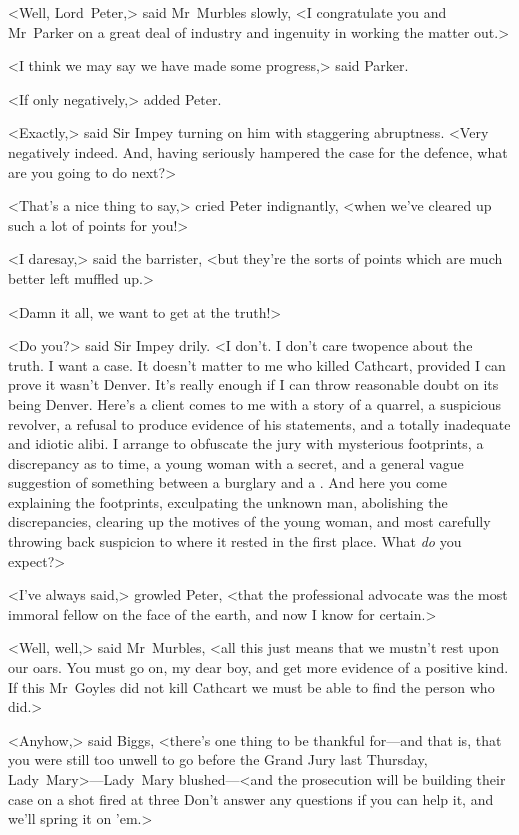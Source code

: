 <Well, Lord~Peter,> said Mr~Murbles slowly, <I congratulate you and Mr~Parker on a great deal of industry and ingenuity in working the matter out.>

<I think we may say we have made some progress,> said Parker.

<If only negatively,> added Peter.

<Exactly,> said Sir Impey turning on him with staggering abruptness.  <Very negatively indeed. And, having seriously hampered the case for the defence, what are you going to do next?>

<That's a nice thing to say,> cried Peter indignantly, <when we've cleared up such a lot of points for you!>

<I daresay,> said the barrister, <but they're the sorts of points which are much better left muffled up.>

<Damn it all, we want to get at the truth!>

<Do you?> said Sir Impey drily. <I don't. I don't care twopence about the truth. I want a case. It doesn't matter to me who killed Cathcart, provided I can prove it wasn't Denver. It's really enough if I can throw reasonable doubt on its being Denver. Here's a client comes to me with a story of a quarrel, a suspicious revolver, a refusal to produce evidence of his statements, and a totally inadequate and idiotic alibi. I arrange to obfuscate the jury with mysterious footprints, a discrepancy as to time, a young woman with a secret, and a general vague suggestion of something between a burglary and a . And here you come explaining the footprints, exculpating the unknown man, abolishing the discrepancies, clearing up the motives of the young woman, and most carefully throwing back suspicion to where it rested in the first place. What \emph{do} you expect?>

<I've always said,> growled Peter, <that the professional advocate was the most immoral fellow on the face of the earth, and now I know for certain.>

<Well, well,> said Mr~Murbles, <all this just means that we mustn't rest upon our oars. You must go on, my dear boy, and get more evidence of a positive kind. If this Mr~Goyles did not kill Cathcart we must be able to find the person who did.>

<Anyhow,> said Biggs, <there's one thing to be thankful for—and that is, that you were still too unwell to go before the Grand Jury last Thursday, Lady~Mary>—Lady~Mary blushed—<and the prosecution will be building their case on a shot fired at three  Don't answer any questions if you can help it, and we'll spring it on 'em.>

